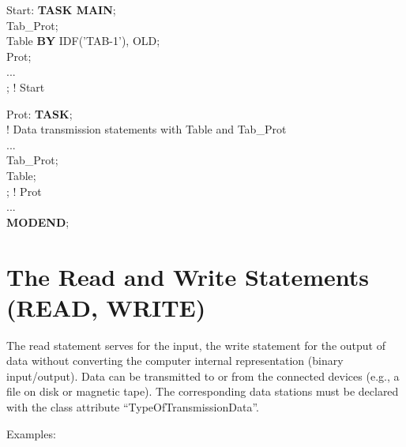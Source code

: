 Start: {\bf TASK MAIN};\\
 Tab\_Prot;\\
 Table {\bf BY} IDF('TAB-1'), OLD;\\
 Prot;\\
\x ...\\
; ! Start

Prot: {\bf TASK};\\
\x ! Data transmission statements with Table and Tab\_Prot\\
\x ...\\
 Tab\_Prot;\\
 Table; \\
; ! Prot \\
... \\
{\bf MODEND};

\section{The Read and Write Statements (READ, WRITE)}   %
\label{sec_read_write}

The read statement serves for the input, the write statement for the
output of data without converting the computer internal representation
(binary input/output). Data can be transmitted to or from the connected
devices (e.g., a file on disk or magnetic tape). The corresponding data
stations must be declared with the class attribute
``TypeOfTransmissionData''.

Examples:

